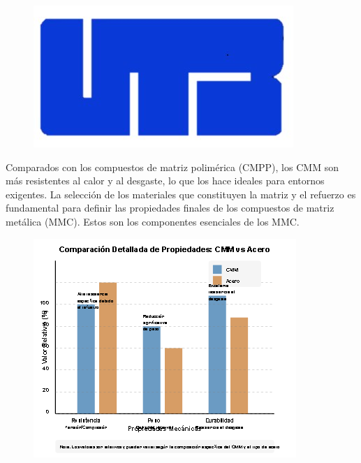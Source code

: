 \documentclass[letterpaper, 12pt]{article}
\begin{document}
\begin{figure}[H]
      \begin{center}
            \includegraphics[width=.5\linewidth]{Images/Imagen1.jpg}
            \label{Diagrama donde se observa la composición interna de un CMM, se aprecia la matriz metálica y el refuerzo, como fibras de cerámica o partículas.}
      \end{center}
\end{figure}

Comparados con los compuestos de matriz polimérica (CMPP), los CMM son más
resistentes al calor y al desgaste, lo que los hace ideales para entornos
exigentes. La selección de los materiales que constituyen la matriz y el
refuerzo es fundamental para definir las propiedades finales de los compuestos
de matriz metálica (MMC). Estos son los componentes esenciales de los MMC.

\begin{figure}[H]
      \begin{center}
            \includegraphics[width=.8\linewidth]{Images/Imagen2.png}
            \label{Gráfico comparativo entre CMM y materiales convencionales (como acero y aluminio) en términos de resistencia, peso y durabilidad.}
      \end{center}
\end{figure}
\end{document}
